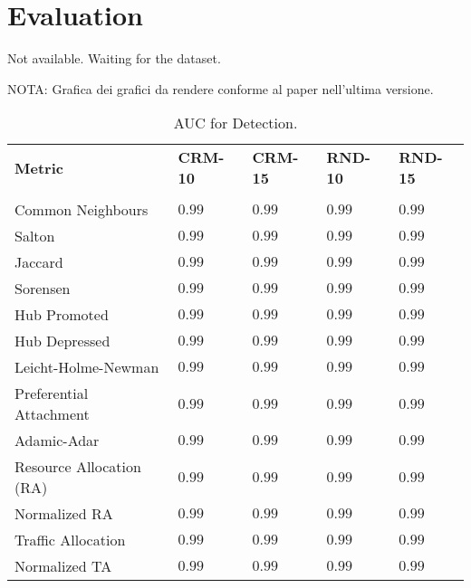 \section{Evaluation}
\label{sec:evaluation}

Not available. Waiting for the dataset.

NOTA: Grafica dei grafici da rendere conforme al paper nell'ultima versione.




    \begin{table}[h]
		\centering
		\begin{tabular}{l l l l l}
		\toprule
		\textbf{Metric} & \textbf{CRM-10} & \textbf{CRM-15} & \textbf{RND-10} & \textbf{RND-15}\\\\
		\midrule
			Common Neighbours & $0.99$ & $0.99$ & $0.99$ & $0.99$ \\
			Salton  & $0.99$ & $0.99$ & $0.99$ & $0.99$ \\
			Jaccard  & $0.99$ & $0.99$ & $0.99$ & $0.99$ \\
			Sorensen   & $0.99$ & $0.99$ & $0.99$ & $0.99$ \\
			Hub Promoted  & $0.99$ & $0.99$ & $0.99$ & $0.99$ \\
			Hub Depressed  & $0.99$ & $0.99$ & $0.99$ & $0.99$ \\
			Leicht-Holme-Newman  & $0.99$ & $0.99$ & $0.99$ & $0.99$ \\
			Preferential Attachment  & $0.99$ & $0.99$ & $0.99$ & $0.99$ \\
			Adamic-Adar  & $0.99$ & $0.99$ & $0.99$ & $0.99$ \\
			Resource Allocation (RA)  & $0.99$ & $0.99$ & $0.99$ & $0.99$ \\
			Normalized RA  & $0.99$ & $0.99$ & $0.99$ & $0.99$ \\
			Traffic Allocation  & $0.99$ & $0.99$ & $0.99$ & $0.99$ \\
			Normalized TA  & $0.99$ & $0.99$ & $0.99$ & $0.99$ \\
		\bottomrule
		\end{tabular}
		\label{tab:attenuazione}
		\caption{AUC for Detection.}
	\end{table}	

